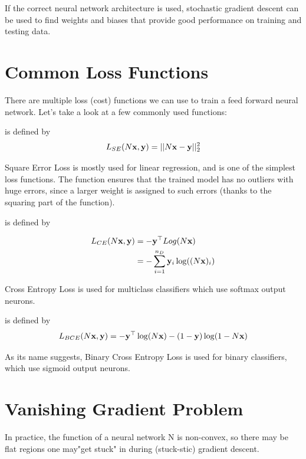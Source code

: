 If the correct neural network architecture is used, stochastic gradient descent can be used to find weights and biases that provide good performance on training and testing data.

\section{Common Loss Functions}

There are multiple loss (cost) functions we can use to train a feed forward neural network. Let's take a look at a few commonly used functions:

\smallskip
\begin{definition}
     is defined by
    $$
    L_{SE}(N\vx,\vy) = ||N\vx-\vy||_{2}^{2}
    $$
\end{definition}
Square Error Loss is mostly used for linear regression, and is one of the simplest loss functions. The function ensures that the trained model has no outliers with huge errors, since a larger weight is assigned to such errors (thanks to the squaring part of the function).

\medskip
\begin{definition}
     is defined by
    \begin{ceqn}
    \begin{align*}
        L_{CE}(N\vx,\vy) &= -\vy^\top Log(N\vx) \\
        &= -\sum_{i=1}^{n_D}{\vy_i\log((N\vx)_i)}
    \end{align*}
    \end{ceqn}
\end{definition}
Cross Entropy Loss is used for multiclass classifiers which use softmax output neurons.

\medskip
\begin{definition}
     is defined by
    $$
    L_{BCE}(N\vx,\vy) = -\vy^\top\log(N\vx) - (1-\vy)\log(1-N\vx)
    $$
\end{definition}
As its name suggests, Binary Cross Entropy Loss is used for binary classifiers, which use sigmoid output neurons.


\section{Vanishing Gradient Problem}
In practice, the function of a neural network N is non-convex, so there may be flat regions one may"get stuck" in during (stuck-stic) gradient descent.

